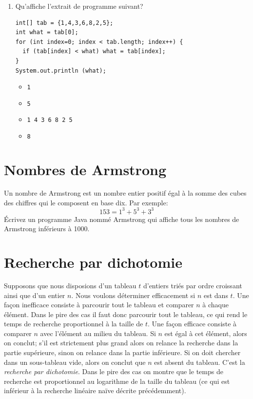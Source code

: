 \documentclass[10pt,a4paper]{article}
\newcommand{\boxitem}{\item[\(\Box\)]}
\begin{document}
\begin{enumerate}
\begin{itemize}
      \boxitem {\small \verb+items[0] = new {8,12,6};+}

      \boxitem
      {\small \begin{verbatim}
int[] temp = {8,12,6};
items[0] = temp;
      \end{verbatim}}
      \vspace*{-10pt}

      \boxitem {\small \verb+items[0] = {8,12,6};+}
  \end{itemize}

  \item Qu'affiche l'extrait de programme suivant?
  {\small \begin{verbatim}
int[] tab = {1,4,3,6,8,2,5};
int what = tab[0];
for (int index=0; index < tab.length; index++) {
  if (tab[index] < what) what = tab[index];
}
System.out.println (what);
  \end{verbatim}}
  \vspace*{-10pt}
  {\small \begin{itemize}
    \boxitem \verb+1+
    \boxitem \verb+5+
    \boxitem \verb+1 4 3 6 8 2 5+
    \boxitem \verb+8+
  \end{itemize}}

\end{enumerate}


\section{Nombres de Armstrong}

Un nombre de Armstrong est un nombre entier positif égal à la somme
des cubes des chiffres qui le composent en base dix. Par exemple:
\[153 = 1^3 + 5^3 + 3^3\] Écrivez un programme Java nommé
\textsf{Armstrong} qui affiche tous les nombres de Armstrong
inférieurs à 1000.


\section{Recherche par dichotomie}

Supposons que nous disposions d'un tableau \(t\) d'entiers triés par
ordre croissant ainsi que d'un entier \(n\). Nous voulons déterminer
efficacement si \(n\) est dans \(t\). Une façon inefficace consiste à
parcourir tout le tableau et comparer \(n\) à chaque élément. Dans le
pire des cas il faut donc parcourir tout le tableau, ce qui rend le
temps de recherche proportionnel à la taille de \(t\). Une façon
efficace consiste à comparer \(n\) avec l'élément au milieu du
tableau. Si \(n\) est égal à cet élément, alors on conclut; s'il est
strictement plus grand alors on relance la recherche dans la partie
supérieure, sinon on relance dans la partie inférieure. Si on doit
chercher dans un sous-tableau vide, alors on conclut que \(n\) est
absent du tableau. C'est la \emph{recherche par dichotomie}. Dans le
pire des cas on montre que le temps de recherche est proportionnel au
logarithme de la taille du tableau (ce qui est inférieur à la
recherche linéaire naïve décrite précédemment).
\end{document}
